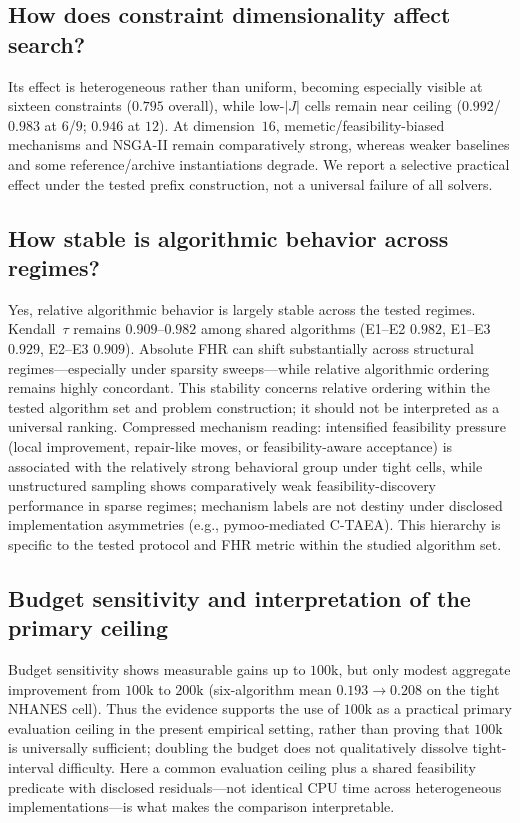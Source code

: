 \documentclass[lettersize,journal]{IEEEtran}
\begin{document}
\subsection{How does constraint dimensionality affect search?}
Its effect is heterogeneous rather than uniform, becoming especially visible at sixteen constraints ($0.795$ overall), while low-$|J|$ cells remain near ceiling ($0.992$/$0.983$ at $6$/$9$; $0.946$ at $12$).
At dimension~$16$, memetic/feasibility-biased mechanisms and NSGA-II remain comparatively strong, whereas weaker baselines and some reference/archive instantiations degrade.
We report a selective practical effect under the tested prefix construction, not a universal failure of all solvers.

\subsection{How stable is algorithmic behavior across regimes?}
Yes, relative algorithmic behavior is largely stable across the tested regimes.
Kendall~$\tau$ remains $0.909$--$0.982$ among shared algorithms (E1--E2 $0.982$, E1--E3 $0.929$, E2--E3 $0.909$).
Absolute FHR can shift substantially across structural regimes---especially under sparsity sweeps---while relative algorithmic ordering remains highly concordant.
This stability concerns relative ordering within the tested algorithm set and problem construction; it should not be interpreted as a universal ranking.
Compressed mechanism reading: intensified feasibility pressure (local improvement, repair-like moves, or feasibility-aware acceptance) is associated with the relatively strong behavioral group under tight cells, while unstructured sampling shows comparatively weak feasibility-discovery performance in sparse regimes; mechanism labels are not destiny under disclosed implementation asymmetries (e.g., pymoo-mediated C-TAEA).
This hierarchy is specific to the tested protocol and FHR metric within the studied algorithm set.

\subsection{Budget sensitivity and interpretation of the primary ceiling}
Budget sensitivity shows measurable gains up to $100\mathrm{k}$, but only modest aggregate improvement from $100\mathrm{k}$ to $200\mathrm{k}$ (six-algorithm mean $0.193\rightarrow 0.208$ on the tight NHANES cell).
Thus the evidence supports the use of $100\mathrm{k}$ as a practical primary evaluation ceiling in the present empirical setting, rather than proving that $100\mathrm{k}$ is universally sufficient; doubling the budget does not qualitatively dissolve tight-interval difficulty.
Here a common evaluation ceiling plus a shared feasibility predicate with disclosed residuals---not identical CPU time across heterogeneous implementations---is what makes the comparison interpretable.
\end{document}

